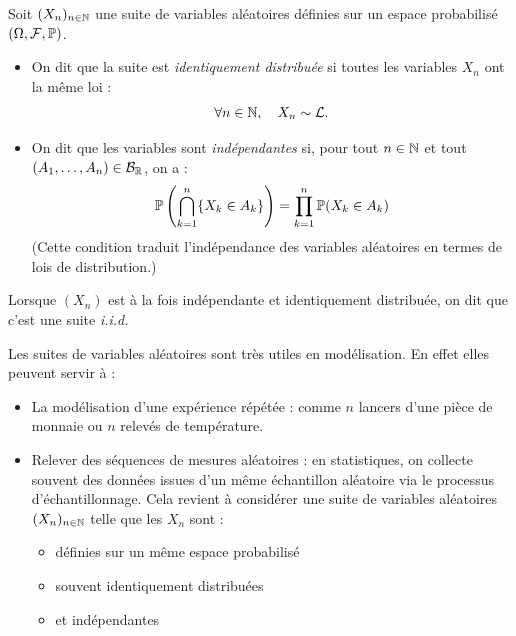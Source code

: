 \begin{definition}[Suite i.i.d.]
    Soit $(X_n)_{n \in \mathbb{N}}$ une suite de variables aléatoires définies sur un espace probabilisé 
    $(\Omega, \mathcal{F}, \mathbb{P})$. 
    
    \begin{itemize}
        \item On dit que la suite est \emph{identiquement distribuée} si toutes les variables $X_n$ ont la même loi :
        \[ \forall n \in \mathbb{N}, \quad X_n \sim \mathcal{L}. \]
        
        \item On dit que les variables sont \emph{indépendantes} si, pour tout $n \in \mathbb{N}$ et tout $(A_1, \dots, A_n) \in \mathcal{B}_{\mathbb{R}}$, on a :
        \[ \mathbb{P}\left( \bigcap_{k = 1}^{n} \{ X_k \in A_k \} \right) = \prod_{k = 1}^{n} \mathbb{P}(X_k \in A_k) \]
        (Cette condition traduit l'indépendance des variables aléatoires en termes de lois de distribution.)
    \end{itemize}
    
    Lorsque $(X_n)$ est à la fois indépendante et identiquement distribuée, on dit que c’est une suite \emph{i.i.d.}
\end{definition}

Les suites de variables aléatoires sont très utiles en modélisation. En effet elles peuvent servir à : 
\begin{itemize}
    \item La modélisation d'une expérience répétée : comme $n$ lancers d'une pièce de monnaie ou $n$ relevés de température. 
    \item Relever des séquences de mesures aléatoires : en statistiques, on collecte souvent des données issues d'un même échantillon 
    aléatoire via le processus d'échantillonnage. Cela revient à considérer une suite de variables aléatoires 
    $(X_n)_{n \in \mathbb{N}}$ telle que les $X_n$ sont : 
        \begin{itemize}
            \item définies sur un même espace probabilisé 
            \item souvent identiquement distribuées 
            \item et indépendantes
        \end{itemize}
\end{itemize}

